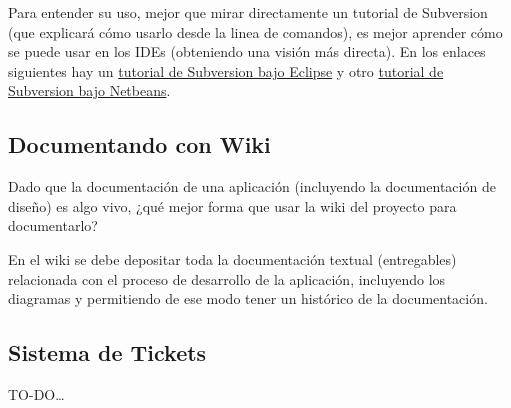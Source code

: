 \documentclass[11pt]{article}
\begin{document}
Para entender su uso, mejor que mirar directamente un tutorial de Subversion
(que explicará cómo usarlo desde la linea de comandos), es mejor aprender cómo se
puede usar en los IDEs (obteniendo una visión más directa). En los enlaces
siguientes hay un \href{http://www.ibm.com/developerworks/opensource/library/os-ecl-subversion/}{tutorial
de Subversion bajo Eclipse} y otro \href{http://netbeans.org/kb/docs/ide/subversion.html}{tutorial de Subversion
bajo Netbeans}.

\subsection{Documentando con Wiki} \label{sec-7-3}

Dado que la documentación de una aplicación (incluyendo la documentación de
diseño) es algo vivo, ¿qué mejor forma que usar la wiki del proyecto para
documentarlo?

En el wiki se debe depositar toda la documentación textual (entregables) relacionada con el proceso de desarrollo de la aplicación, incluyendo los diagramas y permitiendo de ese modo
tener un histórico de la documentación.

\subsection{Sistema de Tickets}
\label{sec-7-4} \label{tickets}

TO-DO\ldots
\end{document}
